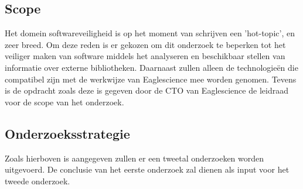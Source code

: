 \subsection{Scope}\label{subsec:scope}
Het domein softwareveiligheid is op het moment van schrijven een 'hot-topic', en zeer breed. Om deze reden is er gekozen om dit onderzoek te beperken tot het veiliger maken van software middels het analyseren en beschikbaar stellen van informatie over externe bibliotheken. Daarnaast zullen alleen de technologieën die compatibel zijn met de werkwijze van Eaglescience mee worden genomen. Tevens is de opdracht zoals deze is gegeven door de CTO van Eaglescience de leidraad voor de scope van het onderzoek.

\subsection{Onderzoeksstrategie}\label{subsec:onderzoek-strategie}
Zoals hierboven is aangegeven zullen er een tweetal onderzoeken worden uitgevoerd. De conclusie van het eerste onderzoek zal dienen als input voor het tweede onderzoek.


